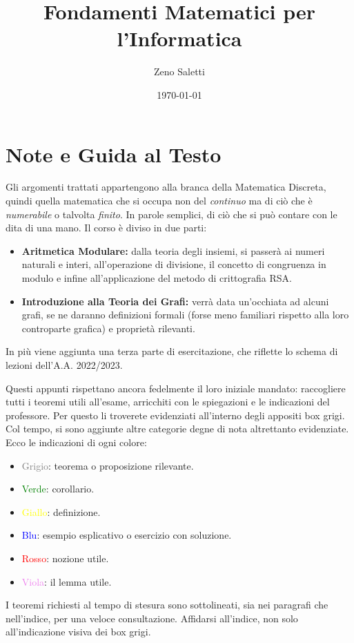 \documentclass[oneside]{book}
\title{Fondamenti Matematici per l'Informatica}
\author{Zeno Saletti}
\date{\today}
\begin{document}
\begin{titlepage}
\maketitle
\end{titlepage}


\section*{Note e Guida al Testo}
Gli argomenti trattati appartengono alla branca della Matematica Discreta,
quindi quella matematica che si occupa non del \textit{continuo} ma di
ciò che è \textit{numerabile} o talvolta \textit{finito}. In parole
semplici, di ciò che si può contare con le dita di una mano. Il corso
è diviso in due parti:
\begin{itemize}
\item \textbf{Aritmetica Modulare:} dalla teoria degli insiemi,
si passerà ai numeri naturali e interi, all'operazione di divisione,
il concetto di congruenza in modulo e infine all'applicazione
del metodo di crittografia RSA.

\item \textbf{Introduzione alla Teoria dei Grafi:} verrà data un'occhiata
ad alcuni grafi, se ne daranno definizioni formali (forse meno familiari
rispetto alla loro controparte grafica) e proprietà rilevanti.
\end{itemize}
In più viene aggiunta una terza parte di esercitazione, che riflette
lo schema di lezioni dell'A.A. 2022/2023.

Questi appunti rispettano ancora fedelmente il loro iniziale mandato:
raccogliere tutti i teoremi utili all'esame, arricchiti con le spiegazioni
e le indicazioni del professore. Per questo li troverete evidenziati
all'interno degli appositi box grigi. Col tempo, si sono aggiunte altre
categorie degne di nota altrettanto evidenziate. Ecco le indicazioni di ogni
colore:
\begin{itemize}
\item \textcolor{gray}{Grigio}: teorema o proposizione rilevante.
\item \textcolor{green}{Verde}: corollario.
\item \textcolor{yellow}{Giallo}: definizione.
\item \textcolor{blue}{Blu}: esempio esplicativo o esercizio con soluzione.
\item \textcolor{red}{Rosso}: nozione utile.
\item \textcolor{violet}{Viola}: il lemma utile.
\end{itemize}
I teoremi richiesti al tempo di stesura sono sottolineati, sia
nei paragrafi che nell'indice, per una veloce consultazione.
Affidarsi all'indice, non solo all'indicazione visiva dei box
grigi.
\end{document}
